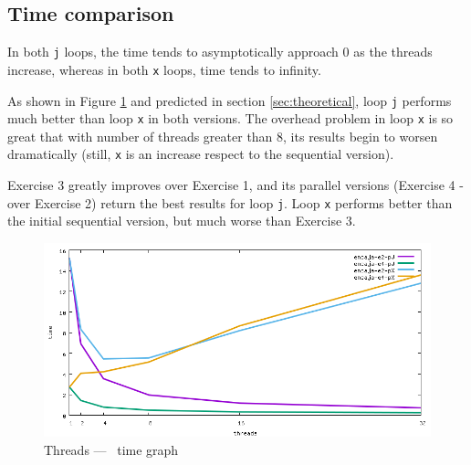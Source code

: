 \documentclass[a4paper]{article}
\begin{document}
\subsection{Time comparison}
In both \texttt{j} loops, the time tends to asymptotically approach 0 as the threads increase, whereas in both \texttt{x} loops, time tends to infinity.

As shown in Figure \ref{fig:graph-time} and predicted in section \ref{sec:theoretical}, loop \texttt{j} performs much better than loop \texttt{x} in both versions. The overhead problem in loop \texttt{x} is so great that with number of threads greater than 8, its results begin to worsen dramatically (still, \texttt{x} is an increase respect to the sequential version).

Exercise 3 greatly improves over Exercise 1, and its parallel versions (Exercise 4 -over Exercise 2) return the best results for loop \texttt{j}. Loop \texttt{x} performs better than the initial sequential version, but much worse than Exercise 3.

\begin{figure}[h]
	\centering
	\includegraphics[width=\textwidth]{../img/time}
	\caption{Threads --- \unskip \, time graph \protect\footnotemark }
	\label{fig:graph-time}
\end{figure}
\end{document}
